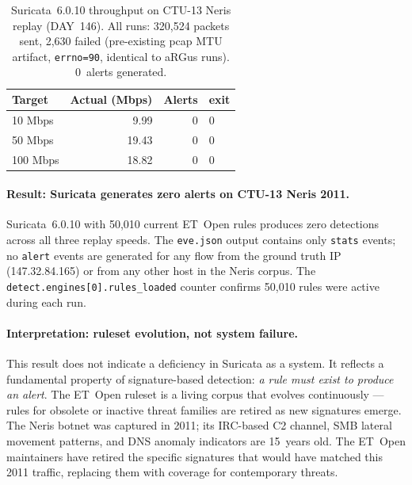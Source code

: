 \documentclass[11pt,a4paper]{article}
\begin{document}
    \begin{table}[h]
        \centering
        \caption{Suricata~6.0.10 throughput on CTU-13 Neris replay (DAY~146).
        All runs: 320,524 packets sent, 2,630 failed (pre-existing pcap MTU artifact,
            \texttt{errno=90}, identical to aRGus runs). 0~alerts generated.}
        \label{tab:suricata_throughput}
        \begin{tabular}{lrrl}
            \toprule
            \textbf{Target} & \textbf{Actual (Mbps)} & \textbf{Alerts} & \textbf{exit} \\
            \midrule
            10 Mbps  &  9.99 & 0 & 0 \\
            50 Mbps  & 19.43 & 0 & 0 \\
            100 Mbps & 18.82 & 0 & 0 \\
            \bottomrule
        \end{tabular}
    \end{table}

    \paragraph{Result: Suricata generates zero alerts on CTU-13 Neris 2011.}
    Suricata~6.0.10 with 50,010 current ET~Open rules produces zero detections across all
    three replay speeds. The \texttt{eve.json} output contains only \texttt{stats} events;
    no \texttt{alert} events are generated for any flow from the ground truth IP
    (147.32.84.165) or from any other host in the Neris corpus. The
    \texttt{detect.engines[0].rules\_loaded} counter confirms 50,010 rules were active
    during each run.

    \paragraph{Interpretation: ruleset evolution, not system failure.}
    This result does not indicate a deficiency in Suricata as a system. It reflects
    a fundamental property of signature-based detection: \emph{a rule must exist to
    produce an alert}. The ET~Open ruleset is a living corpus that evolves
    continuously --- rules for obsolete or inactive threat families are retired as new
    signatures emerge. The Neris botnet was captured in 2011; its IRC-based C2 channel,
    SMB lateral movement patterns, and DNS anomaly indicators are 15~years old.
    The ET~Open maintainers have retired the specific signatures that would have matched
    this 2011 traffic, replacing them with coverage for contemporary threats.
\end{document}
